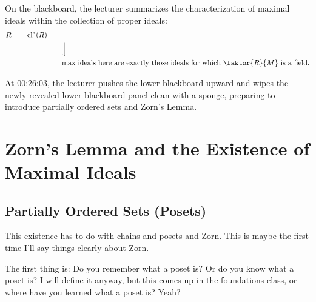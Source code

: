 \begin{content}
On the blackboard, the lecturer summarizes the characterization of maximal ideals within the collection of proper ideals:
\begin{align*}
R \qquad \operatorname{cl}^*(R) \qquad & \\
&\Big\downarrow \\
&\text{max ideals here are exactly those ideals for which } \faktor{R}{M} \text{ is a field.}
\end{align*}

\end{content}

\begin{note}
At 00:26:03, the lecturer pushes the lower blackboard upward and wipes the newly revealed lower blackboard panel clean with a sponge, preparing to introduce partially ordered sets and Zorn's Lemma.
\end{note}

\section{Zorn's Lemma and the Existence of Maximal Ideals}

\subsection{Partially Ordered Sets (Posets)}

\begin{speech}[00:26:28 - 00:27:00]
This existence has to do with chains and posets and Zorn. This is maybe the first time I'll say things clearly about Zorn.

The first thing is: Do you remember what a poset is? Or do you know what a poset is? I will define it anyway, but this comes up in the foundations class, or where have you learned what a poset is? Yeah?
\end{speech}

